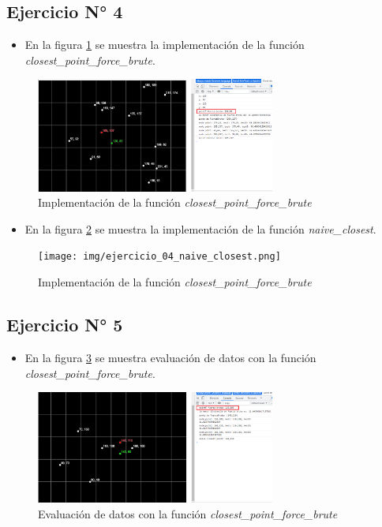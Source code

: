 \documentclass{article}
\begin{document}
\clearpage
\subsection{Ejercicio N° 4}
\begin{itemize}
	\item En la figura \ref{fig:ejercicio_04_closest_point_brute_force} se muestra la implementación de la función \textit{closest\_point\_force\_brute}.
\end{itemize}
\begin{figure}[h!]
	\centering
	\includegraphics[width=0.7\textwidth]{img/ejercicio_04_closest_point_brute_force.png}
	\caption{Implementación de la función \textit{closest\_point\_force\_brute}}
	\label{fig:ejercicio_04_closest_point_brute_force}
\end{figure}

\begin{itemize}
	\item En la figura \ref{fig:ejercicio_04_naive_closest} se muestra la implementación de la función \textit{naive\_closest}.
\end{itemize}
\begin{figure}[h!]
	\centering
	\texttt{[image: img/ejercicio\_04\_naive\_closest.png]}
	\caption{Implementación de la función \textit{closest\_point\_force\_brute}}
	\label{fig:ejercicio_04_naive_closest}
\end{figure}

\clearpage
\subsection{Ejercicio N° 5}
\begin{itemize}
	\item En la figura \ref{fig:ejercicio_05_closest_point_brute_force} se muestra evaluación de datos con la función \textit{closest\_point\_force\_brute}.
\end{itemize}
\begin{figure}[h!]
	\centering
	\includegraphics[width=0.7\textwidth]{img/ejercicio_05_closest_point_brute_force.png}
	\caption{Evaluación de datos con la función \textit{closest\_point\_force\_brute}}
	\label{fig:ejercicio_05_closest_point_brute_force}
\end{figure}
\end{document}
